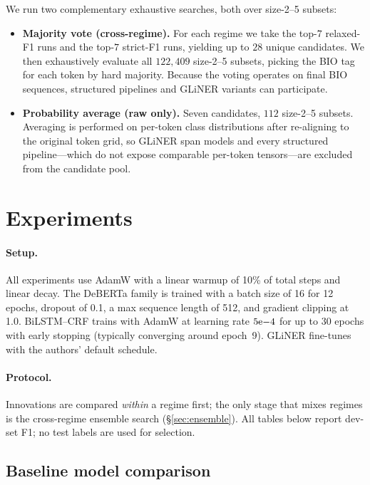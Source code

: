 \documentclass[11pt]{article}
\begin{document}
We run two complementary exhaustive searches, both over size-2--5 subsets:

\begin{itemize}
\itemsep0em
\item \textbf{Majority vote (cross-regime).} For each regime we take the top-$7$ relaxed-F1 runs and the top-$7$ strict-F1 runs, yielding up to $28$ unique candidates. We then exhaustively evaluate all $122{,}409$ size-2--5 subsets, picking the BIO tag for each token by hard majority.
Because the voting operates on final BIO sequences, structured pipelines
and GLiNER variants can participate.
\item \textbf{Probability average (raw only).} Seven candidates, $112$ size-2--5 subsets. Averaging is performed on per-token class distributions after re-aligning to the original token grid, so GLiNER span models and every structured pipeline---which do not expose comparable per-token tensors---are excluded from the candidate pool.
\end{itemize}

\section{Experiments}
\label{sec:exp}

\paragraph{Setup.} All experiments use AdamW with a linear warmup of 10\% of total steps and linear decay. The DeBERTa family is trained with a batch size of 16 for 12 epochs, dropout of 0.1, a max sequence length of 512, and gradient clipping at 1.0. BiLSTM--CRF trains with AdamW at learning rate $5{\rm e}{-4}$ for up to $30$ epochs with early stopping (typically converging around epoch~9). GLiNER fine-tunes with the authors' default schedule.

\paragraph{Protocol.} Innovations are compared \emph{within} a
regime first; the only stage that mixes regimes is the cross-regime
ensemble search (\S\ref{sec:ensemble}). All tables below report dev-set
F1; no test labels are used for selection.

\subsection{Baseline model comparison}
\end{document}
